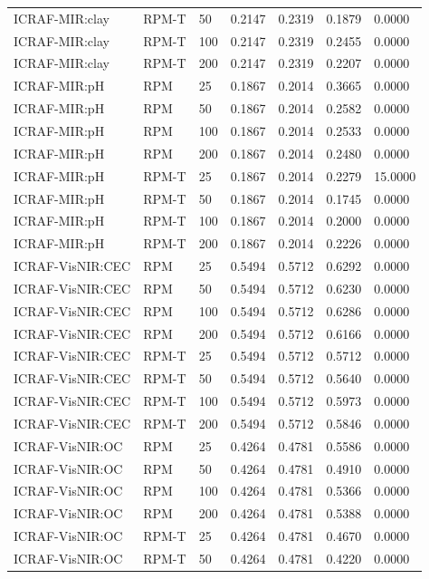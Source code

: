 \begin{tabular}{lllllll}
ICRAF-MIR:clay & RPM-T & 50 & 0.2147 & 0.2319 & 0.1879 & 0.0000 \\
ICRAF-MIR:clay & RPM-T & 100 & 0.2147 & 0.2319 & 0.2455 & 0.0000 \\
ICRAF-MIR:clay & RPM-T & 200 & 0.2147 & 0.2319 & 0.2207 & 0.0000 \\
ICRAF-MIR:pH & RPM & 25 & 0.1867 & 0.2014 & 0.3665 & 0.0000 \\
ICRAF-MIR:pH & RPM & 50 & 0.1867 & 0.2014 & 0.2582 & 0.0000 \\
ICRAF-MIR:pH & RPM & 100 & 0.1867 & 0.2014 & 0.2533 & 0.0000 \\
ICRAF-MIR:pH & RPM & 200 & 0.1867 & 0.2014 & 0.2480 & 0.0000 \\
ICRAF-MIR:pH & RPM-T & 25 & 0.1867 & 0.2014 & 0.2279 & 15.0000 \\
ICRAF-MIR:pH & RPM-T & 50 & 0.1867 & 0.2014 & 0.1745 & 0.0000 \\
ICRAF-MIR:pH & RPM-T & 100 & 0.1867 & 0.2014 & 0.2000 & 0.0000 \\
ICRAF-MIR:pH & RPM-T & 200 & 0.1867 & 0.2014 & 0.2226 & 0.0000 \\
ICRAF-VisNIR:CEC & RPM & 25 & 0.5494 & 0.5712 & 0.6292 & 0.0000 \\
ICRAF-VisNIR:CEC & RPM & 50 & 0.5494 & 0.5712 & 0.6230 & 0.0000 \\
ICRAF-VisNIR:CEC & RPM & 100 & 0.5494 & 0.5712 & 0.6286 & 0.0000 \\
ICRAF-VisNIR:CEC & RPM & 200 & 0.5494 & 0.5712 & 0.6166 & 0.0000 \\
ICRAF-VisNIR:CEC & RPM-T & 25 & 0.5494 & 0.5712 & 0.5712 & 0.0000 \\
ICRAF-VisNIR:CEC & RPM-T & 50 & 0.5494 & 0.5712 & 0.5640 & 0.0000 \\
ICRAF-VisNIR:CEC & RPM-T & 100 & 0.5494 & 0.5712 & 0.5973 & 0.0000 \\
ICRAF-VisNIR:CEC & RPM-T & 200 & 0.5494 & 0.5712 & 0.5846 & 0.0000 \\
ICRAF-VisNIR:OC & RPM & 25 & 0.4264 & 0.4781 & 0.5586 & 0.0000 \\
ICRAF-VisNIR:OC & RPM & 50 & 0.4264 & 0.4781 & 0.4910 & 0.0000 \\
ICRAF-VisNIR:OC & RPM & 100 & 0.4264 & 0.4781 & 0.5366 & 0.0000 \\
ICRAF-VisNIR:OC & RPM & 200 & 0.4264 & 0.4781 & 0.5388 & 0.0000 \\
ICRAF-VisNIR:OC & RPM-T & 25 & 0.4264 & 0.4781 & 0.4670 & 0.0000 \\
ICRAF-VisNIR:OC & RPM-T & 50 & 0.4264 & 0.4781 & 0.4220 & 0.0000 \\

\end{tabular}
